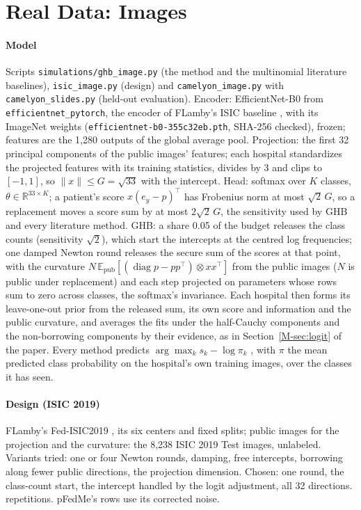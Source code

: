 \documentclass[acmsmall,screen,nonacm]{acmart}
\theoremstyle{acmdefinition}
\begin{document}
\section{Real Data: Images}\label{sec:images}

\paragraph{Model} Scripts \texttt{simulations/ghb\_image.py} (the method and the multinomial literature baselines), \texttt{isic\_image.py} (design) and \texttt{camelyon\_image.py} with \texttt{camelyon\_slides.py} (held-out evaluation). Encoder: EfficientNet-B0 \cite{tan2019efficientnet} from \texttt{efficientnet\_pytorch}, the encoder of FLamby's ISIC baseline \cite{ogierduterrail2022flamby}, with its ImageNet weights (\texttt{efficientnet-b0-355c32eb.pth}, SHA-256 checked), frozen; features are the 1,280 outputs of the global average pool. Projection: the first 32 principal components of the public images' features; each hospital standardizes the projected features with its training statistics, divides by 3 and clips to $[-1,1]$, so $\|x\|\le G=\sqrt{33}$ with the intercept. Head: softmax over $K$ classes, $\theta\in\mathbb{R}^{33\times K}$; a patient's score $x(e_y-p)^\top$ has Frobenius norm at most $\sqrt2\,G$, so a replacement moves a score sum by at most $2\sqrt2\,G$, the sensitivity used by GHB and every literature method. GHB: a share 0.05 of the budget releases the class counts (sensitivity $\sqrt2$), which start the intercepts at the centred log frequencies; one damped Newton round releases the secure sum of the scores at that point, with the curvature $N\,\mathbb{E}_{\text{pub}}[(\operatorname{diag}p-pp^\top)\otimes xx^\top]$ from the public images ($N$ is public under replacement) and each step projected on parameters whose rows sum to zero across classes, the softmax's invariance. Each hospital then forms its leave-one-out prior from the released sum, its own score and information and the public curvature, and averages the fits under the half-Cauchy components and the non-borrowing components by their evidence, as in Section~\ref{M-sec:logit} of the paper. Every method predicts $\arg\max_k s_k-\log\pi_k$ \cite{menon2021longtail}, with $\pi$ the mean predicted class probability on the hospital's own training images, over the classes it has seen.

\paragraph{Design (ISIC 2019)} FLamby's Fed-ISIC2019 \cite{combalia2019bcn20000}, its six centers and fixed splits; public images for the projection and the curvature: the 8,238 ISIC 2019 Test images, unlabeled. Variants tried: one or four Newton rounds, damping, free intercepts, borrowing along fewer public directions, the projection dimension. Chosen: one round, the class-count start, the intercept handled by the logit adjustment, all 32 directions. \SimIsicImgReps{} repetitions. pFedMe's \cite{tdinh2020personalized} rows use its corrected noise.
\end{document}
